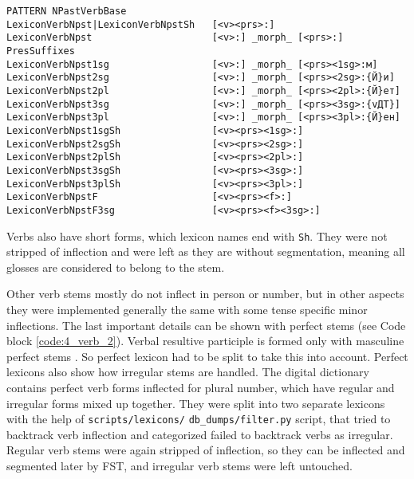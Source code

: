 \begin{code_frame}[float,floatplacement=!h]
    \begin{footnotesize}\codespacing
    \begin{verbatim}
PATTERN NPastVerbBase
LexiconVerbNpst|LexiconVerbNpstSh   [<v><prs>:]
LexiconVerbNpst                     [<v>:] _morph_ [<prs>:] PresSuffixes  
LexiconVerbNpst1sg                  [<v>:] _morph_ [<prs><1sg>:м]       
LexiconVerbNpst2sg                  [<v>:] _morph_ [<prs><2sg>:{Й}и]    
LexiconVerbNpst2pl                  [<v>:] _morph_ [<prs><2pl>:{Й}ет]   
LexiconVerbNpst3sg                  [<v>:] _morph_ [<prs><3sg>:{vДТ}]   
LexiconVerbNpst3pl                  [<v>:] _morph_ [<prs><3pl>:{Й}ен]   
LexiconVerbNpst1sgSh                [<v><prs><1sg>:]                    
LexiconVerbNpst2sgSh                [<v><prs><2sg>:]                    
LexiconVerbNpst2plSh                [<v><prs><2pl>:]                    
LexiconVerbNpst3sgSh                [<v><prs><3sg>:]                    
LexiconVerbNpst3plSh                [<v><prs><3pl>:]                    
LexiconVerbNpstF                    [<v><prs><f>:]                      
LexiconVerbNpstF3sg                 [<v><prs><f><3sg>:]                 
    \end{verbatim}
    \end{footnotesize}
    \tcblower
    \label{code:4_verb_1}
\end{code_frame}

Verbs also have short forms, which lexicon names end with \texttt{Sh}. They were not stripped of inflection and were left as they are without segmentation, meaning all glosses are considered to belong to the stem.

Other verb stems mostly do not inflect in person or number, but in other aspects they were implemented generally the same with some tense specific minor inflections. The last important details can be shown with perfect stems (see Code block \ref{code:4_verb_2}). Verbal resultive participle is formed only with masculine perfect stems \parencite[370]{parker_shughni_2023}. So perfect lexicon had to be split to take this into account. Perfect lexicons also show how irregular stems are handled. The digital dictionary contains perfect verb forms inflected for plural number, which have regular and irregular forms mixed up together. They were split into two separate lexicons with the help of \texttt{scripts/lexicons/} \texttt{db\_dumps/filter.py} script, that tried to backtrack verb inflection and categorized failed to backtrack verbs as irregular. Regular verb stems were again stripped of inflection, so they can be inflected and segmented later by FST, and irregular verb stems were left untouched.

